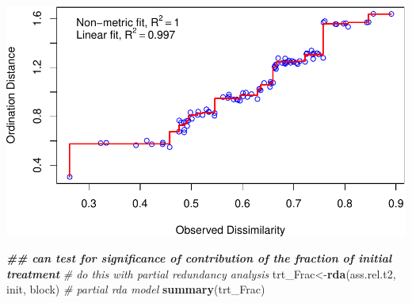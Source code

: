 \documentclass[
]{article}
\newenvironment{Shaded}{\begin{snugshade}}{\end{snugshade}}
\newcommand{\CommentTok}[1]{\textcolor[rgb]{0.56,0.35,0.01}{\textit{#1}}}
\newcommand{\DocumentationTok}[1]{\textcolor[rgb]{0.56,0.35,0.01}{\textbf{\textit{#1}}}}
\newcommand{\FunctionTok}[1]{\textcolor[rgb]{0.13,0.29,0.53}{\textbf{#1}}}
\newcommand{\NormalTok}[1]{#1}
\newcommand{\OtherTok}[1]{\textcolor[rgb]{0.56,0.35,0.01}{#1}}
\begin{document}
\includegraphics{log-project-aubrie-winnie_files/figure-latex/unnamed-chunk-6-1.pdf}

\begin{Shaded}
\begin{Highlighting}[]
\DocumentationTok{\#\# can test for significance of contribution of the fraction of initial treatment}
\CommentTok{\# do this with partial redundancy analysis}
\NormalTok{trt\_Frac}\OtherTok{\textless{}{-}}\FunctionTok{rda}\NormalTok{(ass.rel.t2, init, block) }\CommentTok{\# partial rda model}
\FunctionTok{summary}\NormalTok{(trt\_Frac) }
\end{Highlighting}
\end{Shaded}
\end{document}
